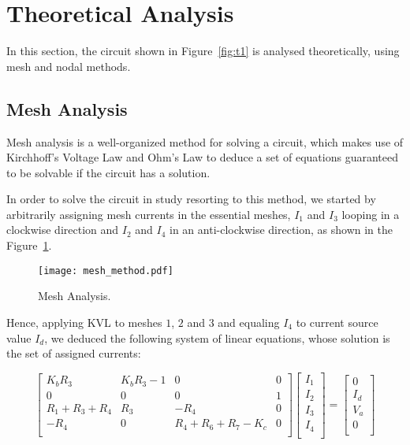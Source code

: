 \section{Theoretical Analysis}
\label{sec:analysis}

In this section, the circuit shown in Figure~\ref{fig:t1} is analysed
theoretically, using mesh and nodal methods.

\subsection{Mesh Analysis}

Mesh analysis is a well-organized method for solving a circuit, which makes use of Kirchhoff’s Voltage Law and Ohm's Law to deduce a set of equations guaranteed to be solvable if the circuit has a solution.

In order to solve the circuit in study resorting to this method, we started by arbitrarily assigning mesh currents in the essential meshes, $I_1$ and $I_3$ looping in a clockwise direction and $I_2$ and $I_4$ in an anti-clockwise direction, as shown in the Figure~\ref{fig:mesh}.

\vspace{-8mm}

\begin{figure}[H] \centering
\texttt{[image: mesh\_method.pdf]}
\caption{Mesh Analysis.}
\label{fig:mesh}
\end{figure}

Hence, applying KVL to meshes $1$, $2$ and $3$ and equaling $I_4$ to current source value $I_d$, we deduced the following system of linear equations, whose solution is the set of assigned currents:

\vspace{1mm}

\[
{\begin{bmatrix}
K_b R_3 & K_b R_3 - 1 & 0 & 0\\
0 & 0 & 0 & 1\\
R_1 + R_3 + R_4 & R_3 & -R_4 & 0\\
-R_4 & 0 & R_4 + R_6 + R_7 - K_c & 0\\
            \end{bmatrix}
            }
{\begin{bmatrix}
I_1\\
I_2\\
I_3\\
I_4\\
            \end{bmatrix}
            }
    =
{\begin{bmatrix}
0\\
I_d\\
V_a\\
0\\
            \end{bmatrix}
            }
\]


